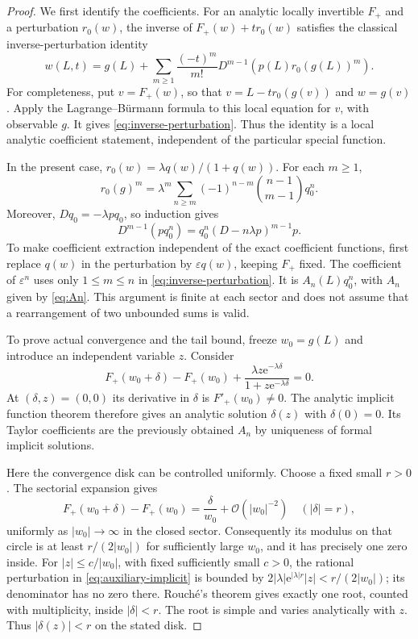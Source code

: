 \documentclass[11pt,a4paper]{article}
\theoremstyle{definition}
\numberwithin{equation}{section}
\newcommand{\ee}{\mathrm{e}}
\newcommand{\Oh}{\mathcal O}
\newcommand{\eps}{\varepsilon}
\begin{document}
\begin{proof}
We first identify the coefficients. For an analytic locally invertible $F_+$ and a perturbation $r_0(w)$, the inverse of $F_+(w)+t r_0(w)$ satisfies the classical inverse-perturbation identity
\begin{equation}
 w(L,t)=g(L)+\sum_{m\ge1}\frac{(-t)^m}{m!}
                D^{m-1}\left(p(L)r_0(g(L))^m\right).
 \label{eq:inverse-perturbation}
\end{equation}
For completeness, put $v=F_+(w)$, so that $v=L-t r_0(g(v))$ and $w=g(v)$. Apply the Lagrange--B\"urmann formula to this local equation for $v$, with observable $g$. It gives \eqref{eq:inverse-perturbation}. Thus the identity is a local analytic coefficient statement, independent of the particular special function.

In the present case, $r_0(w)=\lambda q(w)/(1+q(w))$. For each $m\ge1$,
\[
 r_0(g)^m=\lambda^m\sum_{n\ge m}
              (-1)^{n-m}\binom{n-1}{m-1}q_0^n.
\]
Moreover, $Dq_0=-\lambda p q_0$, so induction gives
\[
 D^{m-1}(p q_0^n)
       =q_0^n(D-n\lambda p)^{m-1}p.
\]
To make coefficient extraction independent of the exact coefficient functions, first replace $q(w)$ in the perturbation by $\eps q(w)$, keeping $F_+$ fixed. The coefficient of $\eps^n$ uses only $1\le m\le n$ in \eqref{eq:inverse-perturbation}. It is $A_n(L)q_0^n$, with $A_n$ given by \eqref{eq:An}. This argument is finite at each sector and does not assume that a rearrangement of two unbounded sums is valid.

To prove actual convergence and the tail bound, freeze $w_0=g(L)$ and introduce an independent variable $z$. Consider
\begin{equation}
 F_+(w_0+\delta)-F_+(w_0)
 +\frac{\lambda z\ee^{-\lambda\delta}}
        {1+z\ee^{-\lambda\delta}}=0.
 \label{eq:auxiliary-implicit}
\end{equation}
At $(\delta,z)=(0,0)$ its derivative in $\delta$ is $F'_+(w_0)\ne0$. The analytic implicit function theorem therefore gives an analytic solution $\delta(z)$ with $\delta(0)=0$. Its Taylor coefficients are the previously obtained $A_n$ by uniqueness of formal implicit solutions.

Here the convergence disk can be controlled uniformly. Choose a fixed small $r>0$. The sectorial expansion gives
\[
 F_+(w_0+\delta)-F_+(w_0)
       =\frac{\delta}{w_0}+\Oh(|w_0|^{-2})
       \quad (|\delta|=r),
\]
uniformly as $|w_0|\to\infty$ in the closed sector. Consequently its modulus on that circle is at least $r/(2|w_0|)$ for sufficiently large $w_0$, and it has precisely one zero inside. For $|z|\le c/|w_0|$, with fixed sufficiently small $c>0$, the rational perturbation in \eqref{eq:auxiliary-implicit} is bounded by $2|\lambda|\ee^{|\lambda|r}|z|<r/(2|w_0|)$; its denominator has no zero there. Rouch\'e's theorem gives exactly one root, counted with multiplicity, inside $|\delta|<r$. The root is simple and varies analytically with $z$. Thus $|\delta(z)|<r$ on the stated disk.


\end{proof}
\end{document}

